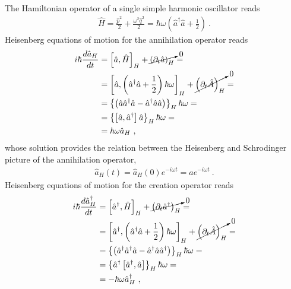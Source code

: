 \documentclass[letterpaper,10pt,english]{jupyterBook}
\begin{document}
\sphinxAtStartPar
The Hamiltonian operator of a single simple harmonic oscillator reads
\begin{equation*}
\begin{split}\hat{H} = \frac{\hat{p}^2}{2} + \frac{\omega^2 \hat{q}^2}{2} = \hbar \omega \left( \hat{a}^{\dagger} \hat{a} + \frac{1}{2} \right) \ .\end{split}
\end{equation*}
\sphinxAtStartPar
{} Heisenberg equations of motion for the annihilation operator reads
\begin{equation*}
\begin{split}\begin{aligned}
  i \hbar \dfrac{d \hat{a}_H}{d t}
  & = \left[ \hat{a}, \hat{H} \right]_{H} + \cancelto{0}{\left( \partial_t \hat{a} \right)_H} = \\
  & = \left[ \hat{a}, \left( \hat{a}^\dagger \hat{a} + \frac{1}{2} \right) \hbar \omega \right]_{H} + \cancelto{0}{\left( \partial_t \hat{A} \right)_H} = \\
  & = \left\{ \left( \hat{a} \hat{a}^\dagger \hat{a} - \hat{a}^\dagger \hat{a} \hat{a} \right)  \right\}_H \hbar \omega = \\
  & = \left\{ \left[ \hat{a}, \hat{a}^\dagger \right] \hat{a} \right\}_H \hbar \omega = \\
  & = \hbar \omega  \hat{a}_{H} \ ,
\end{aligned}\end{split}
\end{equation*}
\sphinxAtStartPar
whose solution provides the relation between the Heisenberg and Schrodinger picture of the annihilation operator,
\begin{equation*}
\begin{split}\hat{a}_H(t) = \hat{a}_H(0) e^{-i \omega t} = \hat{a} e^{-i \omega t} \ .\end{split}
\end{equation*}
\sphinxAtStartPar
{} Heisenberg equations of motion for the creation operator reads
\begin{equation*}
\begin{split}\begin{aligned}
  i \hbar \dfrac{d \hat{a}^\dagger_H}{d t}
  & = \left[ \hat{a}^\dagger, \hat{H} \right]_{H} + \cancelto{0}{\left( \partial_t \hat{a}^\dagger \right)_H} = \\
  & = \left[ \hat{a}^\dagger, \left( \hat{a}^\dagger \hat{a} + \frac{1}{2} \right) \hbar \omega \right]_{H} + \cancelto{0}{\left( \partial_t \hat{A} \right)_H} = \\
  & = \left\{ \left( \hat{a}^\dagger \hat{a}^\dagger \hat{a} - \hat{a}^\dagger \hat{a} \hat{a}^\dagger \right)  \right\}_H \hbar \omega = \\
  & = \left\{ \hat{a}^\dagger \left[ \hat{a}^\dagger, \hat{a} \right] \right\}_H \hbar \omega = \\
  & = - \hbar \omega  \hat{a}^\dagger_{H} \ ,
\end{aligned}\end{split}
\end{equation*}
\end{document}
